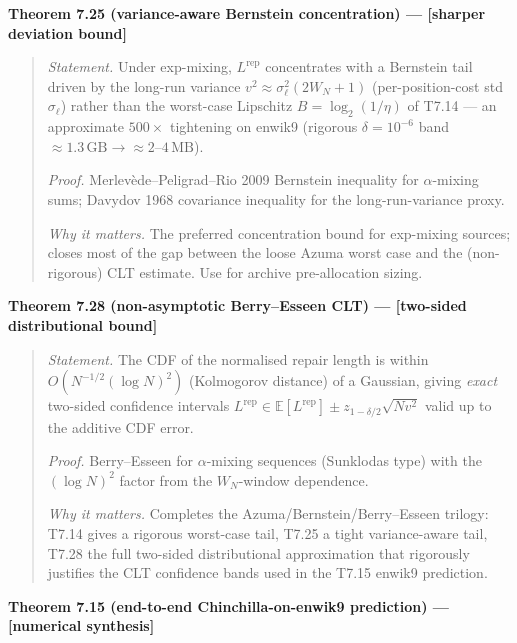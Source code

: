 \documentclass[
]{article}
\begin{document}
\textbf{Theorem 7.25 (variance-aware Bernstein concentration) ---
{[}sharper deviation bound{]}}

\begin{quote}
\emph{Statement.} Under exp-mixing, $L^{\mathrm{rep}}$ concentrates
with a Bernstein tail driven by the long-run variance
$v^2 \approx \sigma_\ell^2(2W_N+1)$ (per-position-cost std
$\sigma_\ell$) rather than the worst-case Lipschitz $B = \log_2(1/\eta)$
of T7.14 --- an approximate $500\times$ tightening on enwik9
(rigorous $\delta = 10^{-6}$ band $\approx 1.3\,\mathrm{GB} \to
\approx 2$--$4\,\mathrm{MB}$).

\emph{Proof.} Merlev\`ede--Peligrad--Rio 2009 Bernstein inequality for
$\alpha$-mixing sums; Davydov 1968 covariance inequality for the
long-run-variance proxy.

\emph{Why it matters.} The preferred concentration bound for
exp-mixing sources; closes most of the gap between the loose Azuma
worst case and the (non-rigorous) CLT estimate. Use for archive
pre-allocation sizing.
\end{quote}

\textbf{Theorem 7.28 (non-asymptotic Berry--Esseen CLT) ---
{[}two-sided distributional bound{]}}

\begin{quote}
\emph{Statement.} The CDF of the normalised repair length is within
$O(N^{-1/2}(\log N)^2)$ (Kolmogorov distance) of a Gaussian, giving
\emph{exact} two-sided confidence intervals
$L^{\mathrm{rep}} \in \mathbb{E}[L^{\mathrm{rep}}] \pm
z_{1-\delta/2}\sqrt{N v^2}$ valid up to the additive CDF error.

\emph{Proof.} Berry--Esseen for $\alpha$-mixing sequences (Sunklodas
type) with the $(\log N)^2$ factor from the $W_N$-window dependence.

\emph{Why it matters.} Completes the Azuma/Bernstein/Berry--Esseen
trilogy: T7.14 gives a rigorous worst-case tail, T7.25 a tight
variance-aware tail, T7.28 the full two-sided distributional
approximation that rigorously justifies the CLT confidence bands used
in the T7.15 enwik9 prediction.
\end{quote}

\textbf{Theorem 7.15 (end-to-end Chinchilla-on-enwik9 prediction) ---
{[}numerical synthesis{]}}
\end{document}

